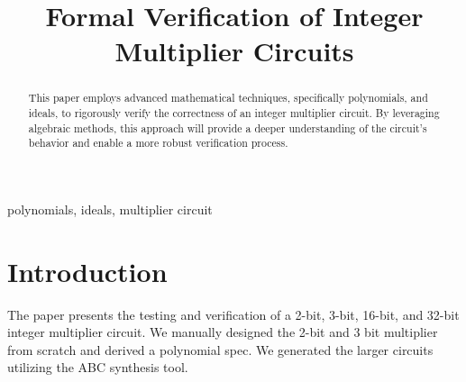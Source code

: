 \documentclass[conference]{IEEEtran}
\begin{document}
\title{Formal Verification of Integer Multiplier Circuits\\}

\author{
\and
{}
\and
{}
\and
{}
}

\maketitle

\begin{abstract}
This paper employs advanced mathematical techniques, specifically polynomials, and ideals, 
to rigorously verify the correctness of an integer multiplier circuit. By leveraging algebraic methods, 
this approach will provide a deeper understanding of the circuit's behavior and enable a more robust 
verification process. 
\end{abstract}

\begin{IEEEkeywords}
polynomials, ideals, multiplier circuit
\end{IEEEkeywords}

\section{Introduction}
The paper presents the testing and verification of a 2-bit, 3-bit, 16-bit, and 32-bit integer multiplier circuit. We manually 
designed the 2-bit and 3 bit multiplier from scratch and derived a polynomial spec. We generated the larger circuits utilizing 
the ABC synthesis tool.
\end{document}
